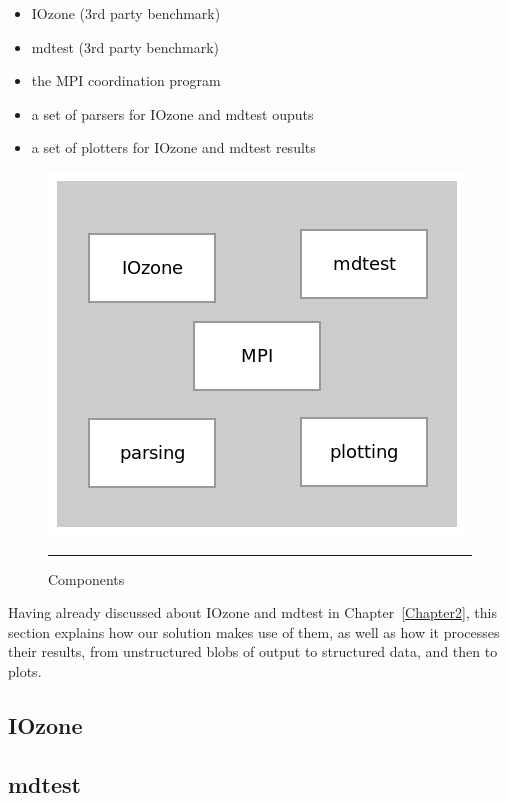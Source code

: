 \begin{itemize}

\item IOzone (3rd party benchmark)
\item mdtest (3rd party benchmark)
\item the MPI coordination program
\item a set of parsers for IOzone and mdtest ouputs
\item a set of plotters for IOzone and mdtest results

\end{itemize}

\begin{figure}[H]
  \centering
    \includegraphics[scale=0.5]{Figures/components.png}
    \rule{25em}{0.5pt}
  \caption[Components]{Components}
  \label{fig:components}
\end{figure}

Having already discussed about IOzone and mdtest in Chapter~\ref{Chapter2}, this section explains how our solution makes use of them, as well as how it processes their results, from unstructured blobs of output to structured data, and then to plots.


\subsection{IOzone}




\subsection{mdtest}

